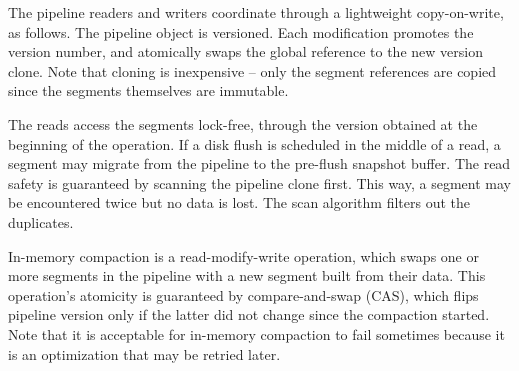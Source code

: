 The pipeline readers and writers coordinate through a lightweight copy-on-write, as follows. The pipeline object is versioned. 
Each modification promotes the version number, and atomically swaps the global reference to the new version clone. Note
that cloning is inexpensive -- only the segment references are copied since the segments themselves are immutable. 

The reads access the segments lock-free, through the version obtained at the beginning of the operation. If a disk flush
is scheduled in the middle of a read, a segment may migrate from the pipeline to the pre-flush snapshot buffer. The read 
safety is guaranteed by scanning the pipeline clone first. This way, a segment may be encountered twice but no data is 
lost. The scan algorithm filters out the duplicates. 

In-memory compaction is a read-modify-write operation, which swaps one or more segments in the pipeline 
with a new segment built from their data. This operation's atomicity is guaranteed by compare-and-swap (CAS), 
which flips pipeline version only if the latter did not change since the compaction started. Note that it is acceptable
for in-memory compaction to fail sometimes because it is an optimization that may be retried later. 

